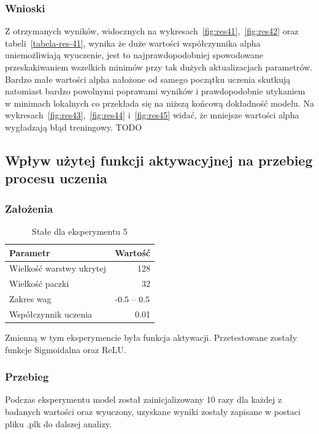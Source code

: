 \documentclass{article}
\begin{document}
\subsubsection*{Wnioski}

Z otrzymanych wyników, widocznych na wykresach~\ref{fig:res41},~\ref{fig:res42} oraz tabeli~\ref{tabela-res-41}, wynika że duże wartości współczynnika alpha uniemożliwiają wyuczenie, jest to najprawdopodobniej spowodowane przeskakiwaniem wszelkich minimów przy tak dużych aktualizacjach parametrów. Bardzo małe wartości alpha nałożone od samego początku uczenia skutkują natomiast bardzo powolnymi poprawami wyników i prawdopodobnie utykaniem w minimach lokalnych co przekłada się na niższą końcową dokładność modelu. Na wykresach~\ref{fig:res43},~\ref{fig:res44} i~\ref{fig:res45} widać, że mniejsze wartości alpha wygładzają błąd treningowy.
TODO

\newpage
\subsection{Wpływ użytej funkcji aktywacyjnej na przebieg procesu uczenia}
\subsubsection*{Założenia}
\begin{table}[H]
	\caption{Stałe dla eksperymentu 5}
	\label{tabela-const-5}
	\centering
	\begin{tabular}{lr}
		\toprule
		Parametr                   & Wartość         \\
		\midrule
		Wielkość warstwy ukrytej & 128               \\
		Wielkość paczki          & 32                \\
		Zakres wag                 & \($-0.5 -- 0.5$\) \\
		Współczynnik uczenia     & 0.01              \\
		\bottomrule
	\end{tabular}
\end{table}

Zmienną w tym eksperymencie była funkcja aktywacji. Przetestowane zostały funkcje Sigmoidalna oraz ReLU.
\subsubsection*{Przebieg}

Podczas eksperymentu model został zainicjalizowany 10 razy dla każdej z badanych wartości oraz wyuczony, uzyskane wyniki zostały zapisane w postaci pliku .plk do dalszej analizy.
\end{document}
